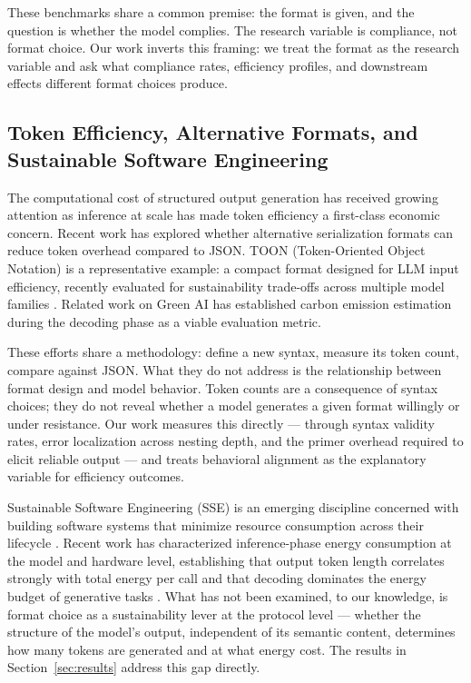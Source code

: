 \documentclass[11pt]{article}
\begin{document}
These benchmarks share a common premise: the format is given, and the question is whether the model complies. The research variable is compliance, not format choice. Our work inverts this framing: we treat the format as the research variable and ask what compliance rates, efficiency profiles, and downstream effects different format choices produce.

\subsection{Token Efficiency, Alternative Formats, and Sustainable Software Engineering}

The computational cost of structured output generation has received growing attention as inference at scale has made token efficiency a first-class economic concern. Recent work has explored whether alternative serialization formats can reduce token overhead compared to JSON. TOON (Token-Oriented Object Notation) is a representative example: a compact format designed for LLM input efficiency, recently evaluated for sustainability trade-offs across multiple model families \cite{masciari2026toon}. Related work on Green AI has established carbon emission estimation during the decoding phase as a viable evaluation metric.

These efforts share a methodology: define a new syntax, measure its token count, compare against JSON. What they do not address is the relationship between format design and model behavior. Token counts are a consequence of syntax choices; they do not reveal whether a model generates a given format willingly or under resistance. Our work measures this directly --- through syntax validity rates, error localization across nesting depth, and the primer overhead required to elicit reliable output --- and treats behavioral alignment as the explanatory variable for efficiency outcomes.

Sustainable Software Engineering (SSE) is an emerging discipline concerned with building software systems that minimize resource consumption across their lifecycle \cite{venters2023sustainable,betz2025sse}. Recent work has characterized inference-phase energy consumption at the model and hardware level, establishing that output token length correlates strongly with total energy per call \cite{husom2024melodi} and that decoding dominates the energy budget of generative tasks \cite{solovyeva2026greenai}. What has not been examined, to our knowledge, is format choice as a sustainability lever at the protocol level --- whether the structure of the model's output, independent of its semantic content, determines how many tokens are generated and at what energy cost. The results in Section~\ref{sec:results} address this gap directly.
\end{document}

